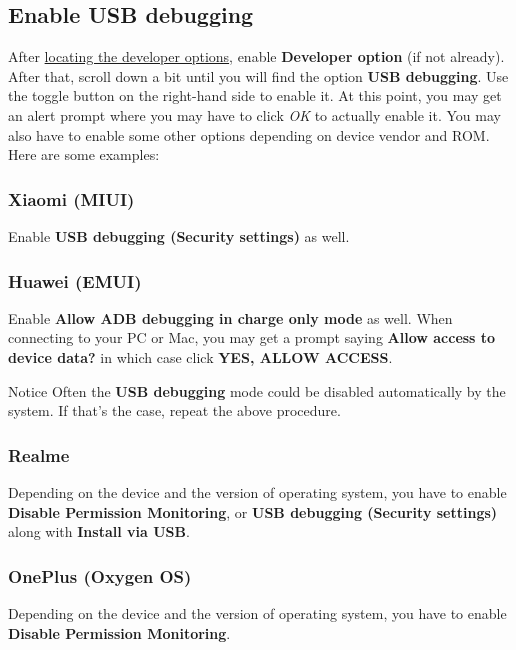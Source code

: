 \subsection{Enable USB debugging}\label{subsec:enable-usb-debugging} %
After \hyperref[subsubsec:location-of-developer-options]{locating the developer options}, enable \textbf{Developer
option} (if not already). After that, scroll down a bit until you will find the option \textbf{USB debugging}. Use the
toggle button on the right-hand side to enable it. At this point, you may get an alert prompt where you may have to
click \textit{OK} to actually enable it. You may also have to enable some other options depending on device vendor and
ROM. Here are some examples:

\subsubsection{Xiaomi (MIUI)} %
Enable \textbf{USB debugging (Security settings)} as well.

\subsubsection{Huawei (EMUI)} %
Enable \textbf{Allow ADB debugging in charge only mode} as well. When connecting to your PC or Mac, you may get a prompt
saying \textbf{Allow access to device data?} in which case click \textbf{YES, ALLOW ACCESS}.

\begin{tip}{Notice}
    Often the \textbf{USB debugging} mode could be disabled automatically by the system. If that's the case, repeat the
    above procedure.
\end{tip}

\subsubsection{Realme} %
Depending on the device and the version of operating system, you have to enable \textbf{Disable Permission Monitoring},
or \textbf{USB debugging (Security settings)} along with \textbf{Install via USB}.

\subsubsection{OnePlus (Oxygen OS)} %
Depending on the device and the version of operating system, you have to enable \textbf{Disable Permission Monitoring}.

